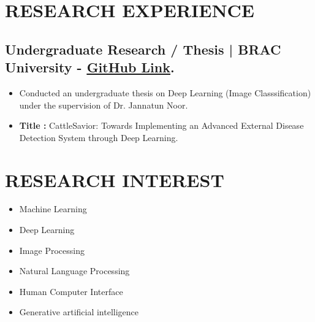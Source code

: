 \documentclass[letterpaper,11pt]{article}
\begin{document}

\section*{\textbf{RESEARCH EXPERIENCE}}
\subsection*{Undergraduate Research / Thesis | BRAC University - 
 \href{https://github.com/ShahidulHaqueShaheeen/Research_Thesis.git}{\underline{\textbf{GitHub Link}}}.}


\begin{itemize}[left=0cm]
    \setlength\itemsep{-0.025em} %
    \setlength\parskip{-0.025em} %
    \fontsize{9.6}{11.2}\selectfont
  \item Conducted an undergraduate thesis on Deep Learning (Image Classsification) under the supervision of Dr. Jannatun Noor.
  \item \textbf{Title :} CattleSavior: Towards Implementing an Advanced External Disease Detection System through Deep Learning.
\end{itemize}


\section*{\textbf{RESEARCH INTEREST}}
\begin{minipage}[t]{0.33\textwidth}
  \begin{itemize}[left=0cm]
    \setlength\itemsep{-0.075em} %
    \setlength\parskip{-0.075em} %
    \item Machine Learning
    \item Deep Learning
  \end{itemize}
\end{minipage}%
\begin{minipage}[t]{0.33\textwidth}
  \begin{itemize}[left=0cm]
    \setlength\itemsep{-0.075em} %
    \setlength\parskip{-0.075em} %
    \item Image Processing
    \item Natural Language Processing
  \end{itemize}
\end{minipage}%
\begin{minipage}[t]{0.33\textwidth}
  \begin{itemize}[left=0cm]
    \setlength\itemsep{-0.075em} %
    \setlength\parskip{-0.075em}
    \item Human Computer Interface
    \item Generative artificial intelligence
  \end{itemize}
\end{minipage}
\end{document}
